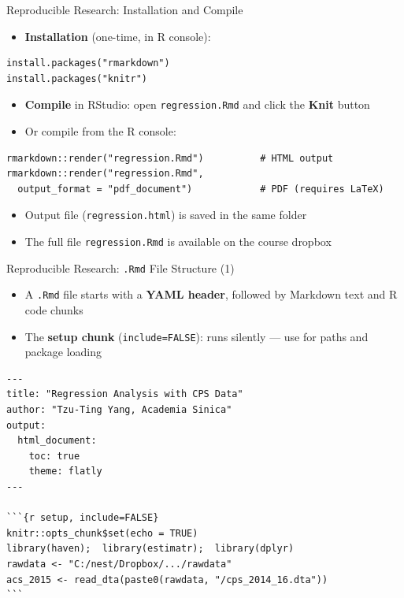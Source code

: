 \documentclass[dvipsnames,hyperref={pdfpagelabels=false}]{beamer}
\begin{document}
\begin{frame}[fragile]{Reproducible Research: Installation and Compile}

	\begin{itemize}
		\item \textbf{Installation} (one-time, in R console):
	\end{itemize}

\begin{lstlisting}
install.packages("rmarkdown")
install.packages("knitr")
\end{lstlisting}

	\begin{itemize}
		\item \textbf{Compile} in RStudio: open \texttt{regression.Rmd} and click the \textbf{Knit} button
		\vspace{0.2cm}
		\item Or compile from the R console:
	\end{itemize}

\begin{lstlisting}
rmarkdown::render("regression.Rmd")          # HTML output
rmarkdown::render("regression.Rmd",
  output_format = "pdf_document")            # PDF (requires LaTeX)
\end{lstlisting}
	\begin{itemize}
		\item Output file (\texttt{regression.html}) is saved in the same folder
		\vspace{0.2cm}
		\item The full file \texttt{regression.Rmd} is available on the course dropbox
	\end{itemize}

\end{frame}



\begin{frame}[fragile]{Reproducible Research: \texttt{.Rmd} File Structure (1)}

	\begin{itemize}
		\item A \texttt{.Rmd} file starts with a \textbf{YAML header}, followed by Markdown text and R code chunks
		\vspace{0.2cm}
		\item The \textbf{setup chunk} (\texttt{include=FALSE}): runs silently --- use for paths and package loading
	\end{itemize}

\begin{lstlisting}[language={},basicstyle=\ttfamily\fontsize{7.5}{9}\selectfont,keywordstyle={}]
---
title: "Regression Analysis with CPS Data"
author: "Tzu-Ting Yang, Academia Sinica"
output:
  html_document:
    toc: true
    theme: flatly
---

```{r setup, include=FALSE}
knitr::opts_chunk$set(echo = TRUE)
library(haven);  library(estimatr);  library(dplyr)
rawdata <- "C:/nest/Dropbox/.../rawdata"
acs_2015 <- read_dta(paste0(rawdata, "/cps_2014_16.dta"))
```
\end{lstlisting}

\end{frame}
\end{document}

